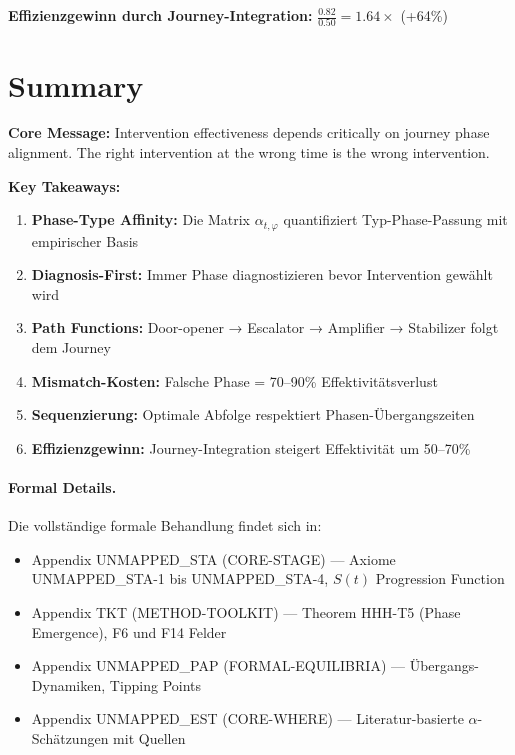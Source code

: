 \textbf{Effizienzgewinn durch Journey-Integration:} $\frac{0.82}{0.50} = 1.64\times$ (+64\%)


\section{Summary}
\label{sec:18-summary}

\begin{tcolorbox}[colback=green!10!white, colframe=green!75!black,
    title=Key Points]

\textbf{Core Message:} Intervention effectiveness depends critically on journey phase alignment. The right intervention at the wrong time is the wrong intervention.

\textbf{Key Takeaways:}
\begin{enumerate}
\item \textbf{Phase-Type Affinity:} Die Matrix $\alpha_{t,\varphi}$ quantifiziert Typ-Phase-Passung mit empirischer Basis
\item \textbf{Diagnosis-First:} Immer Phase diagnostizieren bevor Intervention gewählt wird
\item \textbf{Path Functions:} Door-opener → Escalator → Amplifier → Stabilizer folgt dem Journey
\item \textbf{Mismatch-Kosten:} Falsche Phase = 70--90\% Effektivitätsverlust
\item \textbf{Sequenzierung:} Optimale Abfolge respektiert Phasen-Übergangszeiten
\item \textbf{Effizienzgewinn:} Journey-Integration steigert Effektivität um 50--70\%
\end{enumerate}

\end{tcolorbox}

\paragraph{Formal Details.}
Die vollständige formale Behandlung findet sich in:
\begin{itemize}[nosep]
\item Appendix UNMAPPED_STA (CORE-STAGE) --- Axiome UNMAPPED_STA-1 bis UNMAPPED_STA-4, $S(t)$ Progression Function
\item Appendix TKT (METHOD-TOOLKIT) --- Theorem HHH-T5 (Phase Emergence), F6 und F14 Felder
\item Appendix UNMAPPED_PAP (FORMAL-EQUILIBRIA) --- Übergangs-Dynamiken, Tipping Points
\item Appendix UNMAPPED_EST (CORE-WHERE) --- Literatur-basierte $\alpha$-Schätzungen mit Quellen
\end{itemize}

